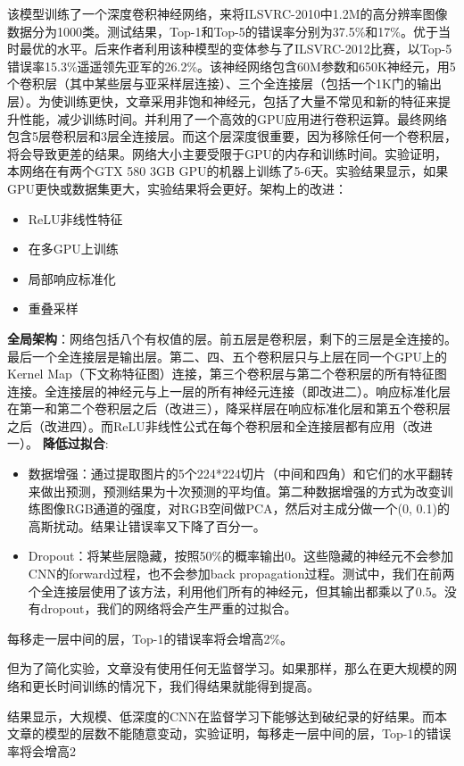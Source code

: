 \documentclass[12pt]{article}
\begin{document}
该模型训练了一个深度卷积神经网络，来将ILSVRC-2010中1.2M的高分辨率图像数据分为1000类。测试结果，Top-1和Top-5的错误率分别为37.5\%和17\%。优于当时最优的水平。后来作者利用该种模型的变体参与了ILSVRC-2012比赛，以Top-5错误率15.3\%遥遥领先亚军的26.2\%。该神经网络包含60M参数和650K神经元，用5个卷积层（其中某些层与亚采样层连接）、三个全连接层（包括一个1K门的输出层）。为使训练更快，文章采用非饱和神经元，包括了大量不常见和新的特征来提升性能，减少训练时间。并利用了一个高效的GPU应用进行卷积运算。最终网络包含5层卷积层和3层全连接层。而这个层深度很重要，因为移除任何一个卷积层，将会导致更差的结果。网络大小主要受限于GPU的内存和训练时间。实验证明，本网络在有两个GTX 580 3GB GPU的机器上训练了5-6天。实验结果显示，如果GPU更快或数据集更大，实验结果将会更好。架构上的改进：
	\begin{itemize}
	\item ReLU非线性特征 
	\item 在多GPU上训练
	\item 局部响应标准化
	\item 重叠采样
	\end{itemize}
\textbf{全局架构}：网络包括八个有权值的层。前五层是卷积层，剩下的三层是全连接的。最后一个全连接层是输出层。第二、四、五个卷积层只与上层在同一个GPU上的Kernel Map（下文称特征图）连接，第三个卷积层与第二个卷积层的所有特征图连接。全连接层的神经元与上一层的所有神经元连接（即改进二）。响应标准化层在第一和第二个卷积层之后（改进三），降采样层在响应标准化层和第五个卷积层之后（改进四）。而ReLU非线性公式在每个卷积层和全连接层都有应用（改进一）。
\textbf{降低过拟合}:
\begin{itemize}
\item 数据增强：通过提取图片的5个224*224切片（中间和四角）和它们的水平翻转来做出预测，预测结果为十次预测的平均值。第二种数据增强的方式为改变训练图像RGB通道的强度，对RGB空间做PCA，然后对主成分做一个(0, 0.1)的高斯扰动。结果让错误率又下降了百分一。

\item Dropout：将某些层隐藏，按照50\%的概率输出0。这些隐藏的神经元不会参加CNN的forward过程，也不会参加back propagation过程。测试中，我们在前两个全连接层使用了该方法，利用他们所有的神经元，但其输出都乘以了0.5。没有dropout，我们的网络将会产生严重的过拟合。
\end{itemize}

每移走一层中间的层，Top-1的错误率将会增高2\%。

但为了简化实验，文章没有使用任何无监督学习。如果那样，那么在更大规模的网络和更长时间训练的情况下，我们得结果就能得到提高。

结果显示，大规模、低深度的CNN在监督学习下能够达到破纪录的好结果。而本文章的模型的层数不能随意变动，实验证明，每移走一层中间的层，Top-1的错误率将会增高2%
\end{document}
